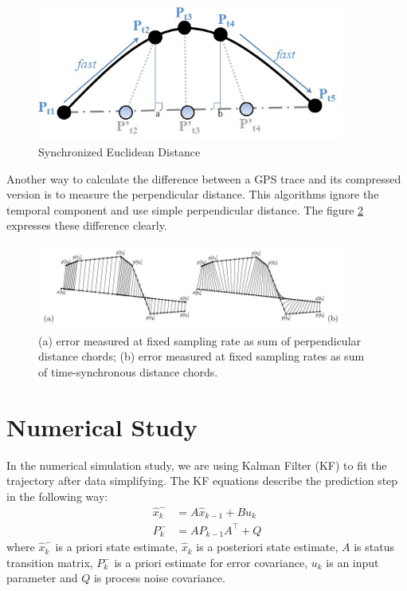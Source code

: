 \begin{figure}[h]
\centering
\includegraphics[width=0.9\textwidth]{Chapters/06Spinoff/plot/sed.jpg}
\caption{Synchronized Euclidean Distance \cite{lawson2011compression}}\label{DataSimpSED}
\end{figure}

Another way to calculate the difference between a GPS trace and its compressed version is to measure the perpendicular distance. This algorithms ignore the temporal component and use simple perpendicular distance. The figure \ref{DataSimpAB} expresses these difference clearly. 

\begin{figure}[h]
\centering
\includegraphics[width=0.9\textwidth]{Chapters/06Spinoff/plot/ab.JPG}
\caption{(a) error measured at fixed sampling rate as sum of perpendicular distance chords; (b) error measured at fixed sampling rates as sum of time-synchronous distance chords. \cite{meratnia2004spatiotemporal}}\label{DataSimpAB}
\end{figure}


\section{Numerical Study}

In the numerical simulation study, we are using Kalman Filter (KF) to fit the trajectory after data simplifying. The KF equations describe the prediction step in the following way: 
\begin{align*}
\hat{x}_k^-&=A\hat{x}_{k-1}+Bu_k \\
P_k^-&=AP_{k-1}A^\top+Q
\end{align*}
where $\hat{x}_k^-$ is a priori state estimate, $\hat{x}_k$ is a posteriori state estimate, $A$ is status transition matrix, $P_k^-$ is a priori estimate for error covariance, $u_k$ is an input parameter and $Q$ is process noise covariance. 

